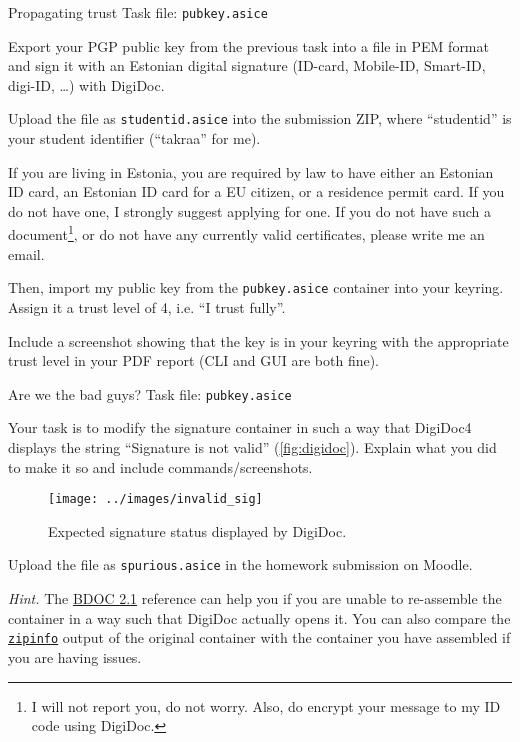 \documentclass{homework}
\begin{document}
\begin{task}{Propagating trust}
  Task file: \texttt{pubkey.asice}

  Export your PGP public key from the previous task into a file in PEM format and sign it with an Estonian digital signature (ID-card, Mobile-ID, Smart-ID, digi-ID, \dots) with DigiDoc.
  
  Upload the file as \texttt{studentid.asice} into the submission ZIP, where \enquote{studentid} is your student identifier (\enquote{takraa} for me).
  \begin{tcolorbox}
    If you are living in Estonia, you are required by law to have either an Estonian ID card, an Estonian ID card for a EU citizen, or a residence permit card.
    If you do not have one, I strongly suggest applying for one.
    \tcblower
    If you do not have such a document\footnote{I will not report you, do not worry. Also, do encrypt your message to my ID code using DigiDoc.}, or do not have any currently valid certificates, please write me an email.
  \end{tcolorbox}

  Then, import my public key from the \texttt{pubkey.asice} container into your keyring.
  Assign it a trust level of 4, i.e. \enquote{I trust fully}.

  Include a screenshot showing that the key is in your keyring with the appropriate trust level in your PDF report (CLI and GUI are both fine).
\end{task}

\newpage

\begin{task}{Are we the bad guys?}
  Task file: \texttt{pubkey.asice}

  Your task is to modify the signature container in such a way that DigiDoc4 displays the string \enquote{Signature is not valid} (\autoref{fig:digidoc}).
  Explain what you did to make it so and include commands/screenshots.

  \begin{figure}[h!]
    \center
    \texttt{[image: ../images/invalid\_sig]}
    \caption{Expected signature status displayed by DigiDoc.}
    \label{fig:digidoc}
  \end{figure}

  Upload the file as \texttt{spurious.asice} in the homework submission on Moodle.

  \textit{Hint.}
  The \href{https://www.id.ee/wp-content/uploads/2021/06/bdoc-spec212-eng.pdf}{BDOC 2.1} reference can help you if you are unable to re-assemble the container in a way such that DigiDoc actually opens it.
  You can also compare the \href{https://man.freebsd.org/cgi/man.cgi?query=zipinfo}{\texttt{zipinfo}} output of the original container with the container you have assembled if you are having issues.
\end{task}
\end{document}
